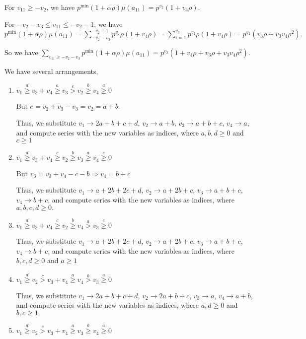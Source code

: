 \documentclass{article}
\begin{document}
For $v_{11}\geq{-v_2}$, we have $p^{\min}(1+\alpha\rho)\mu(a_{11})=p^{v_2}(1+v_4\rho).$

For $-v_2-v_3\leq{v_{11}}\leq{-v_2-1}$, we have $p^{\min}(1+\alpha\rho)\mu(a_{11})=\sum_{-v_2-v_3}^{-v_2-1}p^{v_2}\rho(1+v_4\rho)=\sum_{i=1}^{v_3}p^{v_2}\rho(1+v_4\rho)=p^{v_2}(v_3\rho+v_3v_4\rho^2).$

So we have $\sum_{v_{11}\geq{-v_2-v_3}}p^{\min}(1+\alpha\rho)\mu(a_{11})=p^{v_2}(1+v_4\rho+v_3\rho+v_3v_4\rho^2).$

We have several arrangements,
\begin{enumerate}
    \item 
$v_1\overset{d}{\geq}v_3+v_4\overset{a}{\geq}v_3\overset{c}{>}{v_2}\overset{b}{\geq}v_4\overset{a}{\geq}{0}$

But $e=v_2+v_3-v_3=v_2=a+b.$

Thus, we substitute 
$v_1\rightarrow{2a+b+c+d}$, 
$v_2\rightarrow{a+b}$, 
$v_3\rightarrow{a+b+c}$, 
$v_4\rightarrow{a}$, and compute series with the new variables as indices, where $a,b,d\geq{0}$ and $c\geq{1}$  
    \item 
$v_1\overset{d}{\geq}v_3+v_4\overset{c}{\geq}v_2\overset{b}{\geq}{v_3}\overset{a}{\geq}v_4\overset{e}{\geq}{0}$

But $v_3=v_3+v_4-c-b\Rightarrow{v_4=b+c}$

Thus, we substitute 
$v_1\rightarrow{a+2b+2c+d}$, 
$v_2\rightarrow{a+2b+c}$, 
$v_3\rightarrow{a+b+c}$, 
$v_4\rightarrow{b+c}$, and compute series with the new variables as indices, where $a,b,c,d\geq{0}.$

    \item 
$v_1\overset{d}{\geq}v_3+v_4\overset{c}{\geq}v_2\overset{b}{\geq}{v_4}\overset{a}>v_3\overset{e}{\geq}{0}$

Thus, we substitute 
$v_1\rightarrow{a+2b+2c+d}$, 
$v_2\rightarrow{a+2b+c}$, 
$v_3\rightarrow{a+b+c}$, 
$v_4\rightarrow{b+c}$, and compute series with the new variables as indices, where $b,c,d\geq{0}$ and $a\geq{1}$
    \item 
$v_1\overset{d}{\geq}v_2\overset{c}>v_3+v_4\overset{a}{\geq}{v_4}\overset{b}>v_3\overset{a}{\geq}{0}$

Thus, we substitute 
$v_1\rightarrow{2a+b+c+d}$, 
$v_2\rightarrow{2a+b+c}$, 
$v_3\rightarrow{a}$, 
$v_4\rightarrow{a+b}$, and compute series with the new variables as indices, where $a,d\geq{0}$ and $b,c\geq{1}$
    \item 
$v_1\overset{d}{\geq}v_2\overset{c}>v_3+v_4\overset{a}{\geq}{v_3}\overset{b}\geq{v_4}\overset{a}{\geq}{0}$


\end{enumerate}
\end{document}
